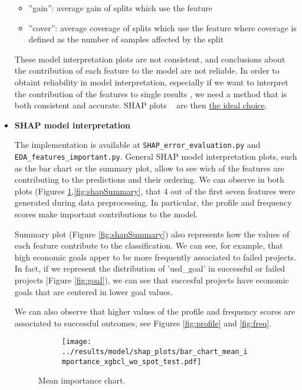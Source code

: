 \documentclass{article}
\begin{document}
\begin{itemize}
\begin{itemize}
\item ”gain”: average gain of splits which use the feature

\item ”cover”: average coverage of splits which use the feature where coverage is defined as the number of samples affected by the split
\end{itemize}

These model interpretation plots are not consistent, and conclusions about the contribution of each feature to the model are not reliable. In order to obtaint reliability in model interpretation, especially if we want to interpret the contribution of the features to single results , we need a method that is both consistent and accurate. SHAP plots ~\cite{DBLP:journals/corr/LundbergL17, lundberg2020local2global} are then \href{https://towardsdatascience.com/interpretable-machine-learning-with-xgboost-9ec80d148d27}{the ideal choice}.

\item \textbf{SHAP model interpretation}

The implementation is available at {\tt SHAP\_error\_evaluation.py} and {\tt EDA\_features\_important.py}.
General SHAP model interpretation plots, such as the bar chart or the summary plot, allow to see wich of the features are contributing to the predictions and their ordering. We can observe in both plots (Figures \ref{fig:shapBar},\ref{fig:shapSummary}, that 4 out of the first seven features were generated during data preprocessing. In particular, the profile and frequency scores make important contributions to the model.

Summary plot (Figure \ref{fig:shapSummary}) also represents how the values of each feature contribute to the classification. We can see, for example, that high economic goals apper to be more frequently associated to failed projects. In fact, if we represent the distribution of 'usd\_goal' in successful or failed projects [Figure \ref{fig:goal}), we can see that succesful projects have economic goals that are centered in lower goal values.

We can also observe that higher values of the profile and frequency scores are associated to successful outcomes, see Figures \ref{fig:profile} and \ref{fig:freq}.

\begin{figure}
  \begin{subfigure}{1\linewidth}
    \centering\texttt{[image: ../results/model/shap\_plots/bar\_chart\_mean\_importance\_xgbcl\_wo\_spot\_test.pdf]}
  \end{subfigure}
\caption{Mean importance chart.}
\label{fig:shapBar}
\end{figure}


\end{itemize}
\end{document}
